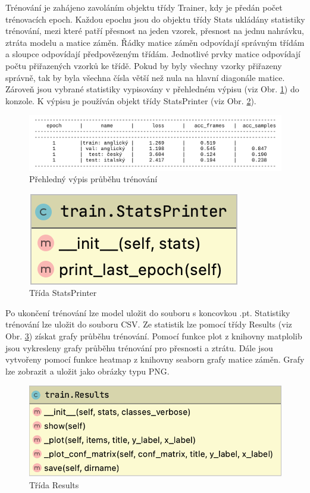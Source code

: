 \documentclass[FM,BP]{tulthesis}
\begin{document}
Trénování je zahájeno zavoláním objektu třídy Trainer, kdy je předán počet trénovacích epoch. Každou epochu jsou do objektu třídy Stats ukládány statistiky trénování, mezi které patří přesnost na jeden vzorek, přesnost na jednu nahrávku, ztráta modelu a matice záměn. Řádky matice záměn odpovídají správným třídám a sloupce odpovídají předpovězeným třídám. Jednotlivé prvky matice odpovídají počtu přiřazených vzorků ke třídě. Pokud by byly všechny vzorky přiřazeny správně, tak by byla všechna čísla větší než nula na hlavní diagonále matice. Zároveň jsou vybrané statistiky vypisovány v přehledném výpisu (viz Obr. \ref{fig:print}) do konzole. K výpisu je používán objekt třídy StatsPrinter (viz Obr. \ref{fig:printer}).

\begin{figure}[ht]
\centerline{\includegraphics[scale=.215]{train_log.png}}
\caption{Přehledný výpis průběhu trénování}
\label{fig:print}
\end{figure}
\FloatBarrier

\begin{figure}[ht]
\centerline{\includegraphics[scale=.32]{train-stats_printer.png}}
\caption{Třída StatsPrinter}
\label{fig:printer}
\end{figure}
\FloatBarrier

Po ukončení trénování lze model uložit do souboru s koncovkou .pt. Statistiky trénování lze uložit do souboru CSV. Ze statistik lze pomocí třídy Results (viz Obr. \ref{fig:results}) získat grafy průběhu trénování. Pomocí funkce plot z knihovny matplolib jsou vykresleny grafy průběhu trénování pro přesnosti a ztrátu. Dále jsou vytvořeny pomocí funkce heatmap z knihovny seaborn grafy matice záměn. Grafy lze zobrazit a uložit jako obrázky typu PNG.

\begin{figure}[ht]
\centerline{\includegraphics[scale=.3]{train-results.png}}
\caption{Třída Results}
\label{fig:results}
\end{figure}
\FloatBarrier
\end{document}
